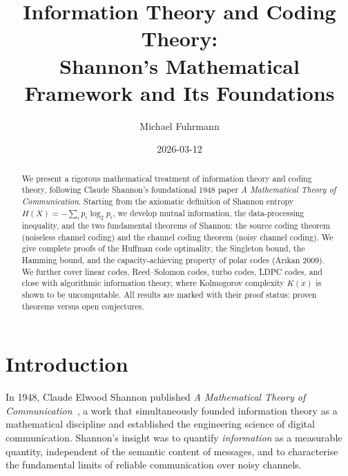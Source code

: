 \documentclass[12pt,a4paper]{amsart}
\theoremstyle{definition}
\theoremstyle{remark}
\begin{document}
\title{Information Theory and Coding Theory:\\
Shannon's Mathematical Framework and Its Foundations}

\author{Michael Fuhrmann}
\address{Specialist Mathematics Project, Build 145}
\date{2026-03-12}

\begin{abstract}
We present a rigorous mathematical treatment of information theory and coding theory,
following Claude Shannon's foundational 1948 paper \emph{A Mathematical Theory of
Communication}. Starting from the axiomatic definition of Shannon entropy
$H(X) = -\sum_i p_i \log_2 p_i$, we develop mutual information, the data-processing
inequality, and the two fundamental theorems of Shannon: the source coding theorem
(noiseless channel coding) and the channel coding theorem (noisy channel coding).
We give complete proofs of the Huffman code optimality, the Singleton bound, the
Hamming bound, and the capacity-achieving property of polar codes (Ar\i{}kan 2009).
We further cover linear codes, Reed--Solomon codes, turbo codes, LDPC codes, and
close with algorithmic information theory, where Kolmogorov complexity $K(x)$ is
shown to be uncomputable. All results are marked with their proof status: proven
theorems versus open conjectures.
\end{abstract}

\maketitle

\tableofcontents

\section{Introduction}

In 1948, Claude Elwood Shannon published \emph{A Mathematical Theory of
Communication}~\cite{Shannon1948}, a work that simultaneously founded information
theory as a mathematical discipline and established the engineering science of
digital communication. Shannon's insight was to quantify \emph{information} as a
measurable quantity, independent of the semantic content of messages, and to
characterise the fundamental limits of reliable communication over noisy channels.
\end{document}
